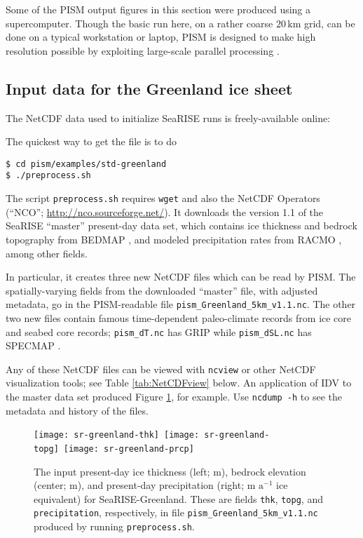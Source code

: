 Some of the PISM output figures in this section were produced using a supercomputer.  Though the basic run here, on a rather coarse $20\,\textrm{km}$ grid, can be done on a typical workstation or laptop, PISM is designed to make high resolution possible by exploiting large-scale parallel processing \cite[among many other examples]{AschwandenAdalgeirsdottirKhroulev,Golledgeetal2012,Golledgeetal2013}.


\subsection{Input data for the Greenland ice sheet}

The NetCDF data used to initialize SeaRISE runs is freely-available online: 
\medskip

\centerline{}
\medskip

\noindent The quickest way to get the file is to do
\begin{verbatim}
$ cd pism/examples/std-greenland
$ ./preprocess.sh
\end{verbatim}
\noindent The script \texttt{preprocess.sh} requires \texttt{wget} and also the NetCDF Operators (``NCO''; \url{http://nco.sourceforge.net/}).  It downloads the version 1.1 of the SeaRISE ``master'' present-day data set, which contains ice thickness and bedrock topography from BEDMAP \cite{BamberLayberryGogenini}, and modeled precipitation rates from RACMO \cite{Ettemaetal2009}, among other fields.

In particular, it creates three new NetCDF files which can be read by PISM.  The spatially-varying fields from the downloaded ``master'' file, with adjusted metadata, go in the PISM-readable file \texttt{pism_Greenland_5km_v1.1.nc}.  The other two new files contain famous time-dependent paleo-climate records from ice core and seabed core records; \texttt{pism_dT.nc} has GRIP \cite{JohnsenetalGRIP} while \texttt{pism_dSL.nc} has SPECMAP \cite{Imbrieetal1984}.

Any of these NetCDF files can be viewed with \texttt{ncview} or other NetCDF visualization tools; see Table \ref{tab:NetCDFview} below.  An application of IDV to the master data set produced Figure \ref{fig:sr-input}, for example.  Use \texttt{ncdump -h} to see the metadata and history of the files.

\begin{figure}[ht]
\centering
\mbox{\texttt{[image: sr-greenland-thk]}
  \qquad
  \texttt{[image: sr-greenland-topg]}
  \qquad
  \texttt{[image: sr-greenland-prcp]}}
\caption{The input present-day ice thickness (left; m), bedrock elevation (center; m), and present-day precipitation (right; m $\text{a}^{-1}$ ice equivalent) for SeaRISE-Greenland.  These are fields \texttt{thk}, \texttt{topg}, and \texttt{precipitation}, respectively, in file \texttt{pism_Greenland_5km_v1.1.nc} produced by running \texttt{preprocess.sh}.}
\label{fig:sr-input}
\end{figure}


